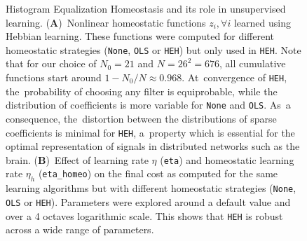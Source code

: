 \documentclass[vision,article,accept,oneauthor,pdftex]{Definitions/mdpi}
\begin{document}
\begin{figure}[H]
\caption{
{Histogram Equalization Homeostasis and its role in unsupervised learning}.
{(\textbf{A})}~Nonlinear homeostatic functions $z_i, \forall i$ learned using Hebbian learning. These functions were computed for different homeostatic strategies (\texttt{None}, \texttt{OLS} or \texttt{HEH}) but only used in \texttt{HEH}. Note that for our choice of $N_0=21$ and $N=26^2=676$, all cumulative functions start around $1 - N_0/N \approx 0.968 $. At~convergence of \texttt{HEH}, the~probability of choosing any filter is equiprobable, while the distribution of coefficients is more variable for \texttt{None} and \texttt{OLS}. As~a consequence, the~distortion between the distributions of sparse coefficients is minimal for \texttt{HEH}, a~property which is essential for the optimal representation of signals in distributed networks such as the brain. %
{(\textbf{B})}~Effect of learning rate $\eta$ (\texttt{eta}) and homeostatic learning rate $\eta_h$ (\texttt{eta\_homeo}) on the final cost as computed for the same learning algorithms but with different homeostatic strategies (\texttt{None}, \texttt{OLS} or \texttt{HEH}). Parameters were explored around a default value and over a 4 octaves logarithmic scale. This shows that \texttt{HEH} is robust across a wide range of parameters.
}
\end{figure}
\end{document}
